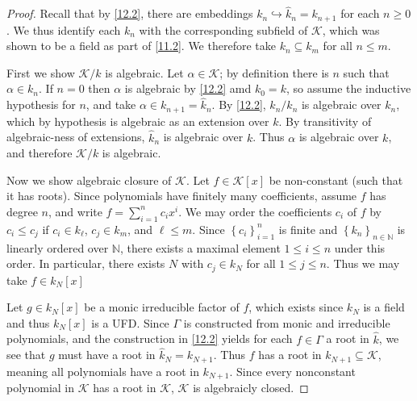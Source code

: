 \documentclass[11pt, letterpaper]{article}
\begin{document}
\begin{proof}
	Recall that by \cref{12.2}, there are embeddings $k_n \hookrightarrow \hat{k} _n = k_{n+1} $ for each $n\geq 0$. We thus identify each $k_n$ with the corresponding subfield of $\mathcal{K} $, which was shown to be a field as part of \cref{11.2}. We therefore take $k_n \subseteq k_m$ for all $n\leq m$.


	First we show $\mathcal{K} /k$ is algebraic. Let $\alpha \in \mathcal{K} $; by definition there is $n$ such that $\alpha \in k_n$. If $n=0$ then $\alpha $ is algebraic by \cref{12.2} amd $k_0=k$, so assume the inductive hypothesis for $n$, and take $\alpha \in k_{n+1} =\hat{k} _n$. By \cref{12.2}, $\hat{k} _n/k_n$ is algebraic over $k_n$, which by hypothesis is algebraic as an extension over $k$. By transitivity of algebraic-ness of extensions, $\hat{k}_n$ is algebraic over $k$. Thus $\alpha $ is algebraic over $k$, and therefore $\mathcal{K} /k$ is algebraic.

	Now we show algebraic closure of $\mathcal{K} $. Let $f\in \mathcal{K} [x]$ be non-constant (such that it has roots). Since polynomials have finitely many coefficients, assume $f$ has degree $n$, and write $f=\sum_{i=1} ^n c_ix^i$. We may order the coefficients $c_i$ of $f$ by $c_i \leq c_j$ if $c_i \in k_\ell $, $c_j\in k_m$, and $\ell \leq m$. Since $\left\{ c_i \right\} _{i=1} ^n$ is finite and $\left\{ k_n \right\}_{n\in\mathbb{N} } $ is linearly ordered over $\mathbb{N} $, there exists a maximal element $1\leq i\leq n$ under this order. In particular, there exists $N$ with $c_j\in k_N$ for all $1\leq j \leq n$. Thus we may take $f\in k_N[x]$

	Let $g\in k_N[x]$ be a monic irreducible factor of $f$, which exists since $k_N$ is a field and thus $k_N[x]$ is a UFD. Since $\Gamma $ is constructed from monic and irreducible polynomials, and the construction in \cref{12.2} yields for each $f\in \Gamma $ a root in $\hat{k} $, we see that $g$ must have a root in $\hat{k} _N = k_{N+1} $. Thus $f$ has a root in $k_{N+1} \subseteq \mathcal{K} $, meaning all polynomials have a root in $k_{N+1} $. Since every nonconstant polynomial in $\mathcal{K} $ has a root in $\mathcal{K} $, $\mathcal{K} $ is algebraicly closed.
\end{proof}
\end{document}

